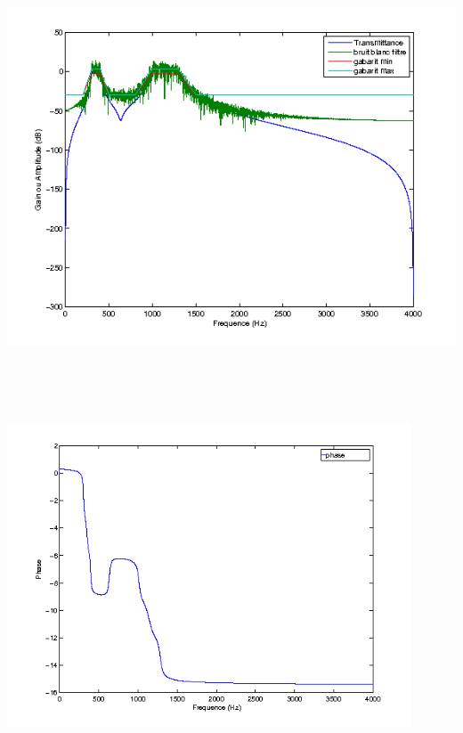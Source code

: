 \documentclass{article}
\begin{document}
\inputminted[linenos,lastline=25]{matlab}{RII_Cheby1m.m}
\includegraphics[height=13cm]{cheb1_1}
\inputminted[linenos,firstnumber=29,firstline=29,lastline=29]{matlab}{RII_Cheby1m.m}
\includegraphics[height=9cm]{cheb1_2}
\inputminted[linenos,firstnumber=34,firstline=34,lastline=42]{matlab}{RII_Cheby1m.m}
\end{document}
